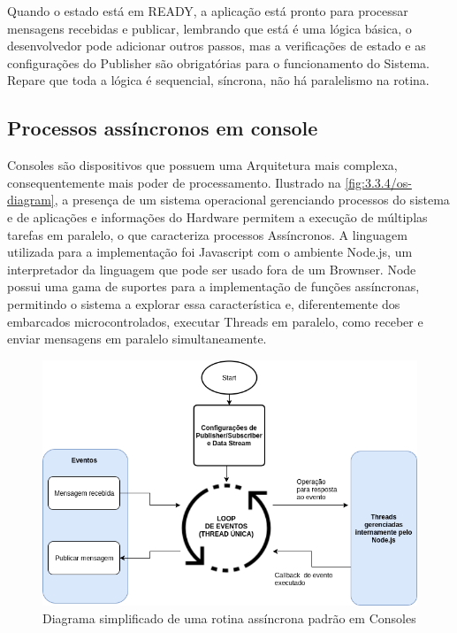 Quando o estado está em READY, a aplicação está pronto para processar mensagens recebidas e publicar, lembrando que está é uma lógica básica, o desenvolvedor pode adicionar outros passos, mas a verificações de estado e as configurações do Publisher são obrigatórias para o funcionamento do Sistema. Repare que toda a lógica é sequencial, síncrona, não há paralelismo na rotina.

\subsection{Processos assíncronos em console}
\label{subsection:consoles_assinc}

Consoles são dispositivos que possuem uma Arquitetura mais complexa, consequentemente mais poder de processamento. Ilustrado na  \ref{fig:3.3.4/os-diagram}, a presença de um sistema operacional gerenciando processos do sistema e de aplicações e informações do Hardware permitem a execução de múltiplas tarefas em paralelo, o que caracteriza processos Assíncronos. A linguagem utilizada para a implementação foi Javascript com o ambiente Node.js, um interpretador da linguagem que pode ser usado fora de um Brownser. Node possui uma gama de suportes para a implementação de funções assíncronas, permitindo o sistema a explorar essa característica e, diferentemente dos embarcados microcontrolados, executar Threads em paralelo, como receber e enviar mensagens em paralelo simultaneamente.


\begin{figure}[h!]
\centering
\includegraphics[width=13cm]{./02_Capitulos/02_Cap3/figures/async-implementation}
\caption{Diagrama simplificado de uma rotina assíncrona padrão em Consoles}
\label{fig:async-implementation}
\end{figure}


